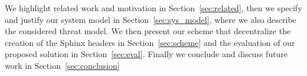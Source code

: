 We highlight related work and motivation in Section~\ref{sec:related}, then we specify and justify our system model in Section~\ref{sec:sys_model}, where we also describe the considered threat model. We then present our scheme that decentralize the creation of the Sphinx headers in Section~\ref{sec:scheme} and the evaluation of our proposed solution in Section~\ref{sec:eval}. Finally we conclude and discuss future work in Section~\ref{sec:conclusion}
